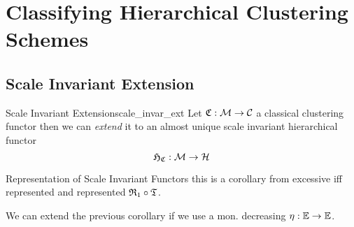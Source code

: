\chapter{Classifying Hierarchical Clustering Schemes}

\section{Scale Invariant Extension}
\todo
\begin{definition}{Scale Invariant Extension}{scale_invar_ext}
Let $\mathfrak{C}: \mathcal{M} \to \mathcal{C}$ a classical clustering functor then we can \emph{extend} it to an almost unique scale invariant hierarchical functor
$$
\mathfrak{H}_{\mathfrak{C}}: \mathcal{M} \to \mathcal{H}
$$
\end{definition}

\begin{corollary}{Representation of Scale Invariant Functors}{}
this is a corollary from excessive iff represented and represented $\mathfrak{R}_1 \circ \mathfrak{T}$.
\end{corollary}

\begin{myremark}{}{}
We can extend the previous corollary if we use a mon. decreasing $\eta: \mathbb E \to \mathbb E$.
\end{myremark}